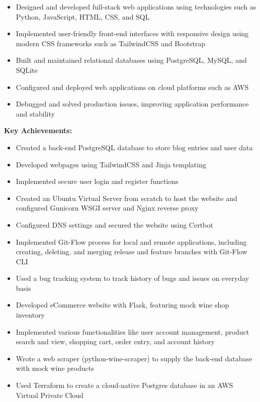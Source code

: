 \documentclass[
    10pt,
    A4,
    english,
    draft = false,
    twoside = false,
]{article}
\begin{document}
    {
    \begin{itemize}
      \item Designed and developed full-stack web applications using technologies such as Python,           JavaScript, HTML, CSS, and SQL
      \item Implemented user-friendly front-end interfaces with responsive design using modern CSS          frameworks such as TailwindCSS and Bootstrap
      \item Built and maintained relational databases using PostgreSQL, MySQL, and SQLite
      \item Configured and deployed web applications on cloud platforms such as AWS
      \item Debugged and solved production issues, improving application performance and stability
   \end{itemize}
   \begin{description}
   \textcolor{light-blue}
    {\-\hspace{-.45cm} \textbf{Key Achievements:}}
   \end{description}
   \begin{itemize}
      \item Created a back-end PostgreSQL database to store blog entries and user data
      \item Developed webpages using TailwindCSS and Jinja templating
      \item Implemented secure user login and register functions
      \item Created an Ubuntu Virtual Server from scratch to host the website and configured Gunicorn WSGI server and Nginx reverse proxy
      \item Configured DNS settings and secured the website using Certbot
      \item Implemented Git-Flow process for local and remote applications, including creating, deleting, and merging release and feature branches with Git-Flow CLI
      \item Used a bug tracking system to track history of bugs and issues on everyday basis
      \item Developed eCommerce website with Flask, featuring mock wine shop inventory
      \item Implemented various functionalities like user account management, product search and view, shopping cart, order entry, and account history
      \item Wrote a web scraper (python-wine-scraper) to supply the back-end database with mock wine products
      \item Used Terraform to create a cloud-native Postgres database in an AWS Virtual Private Cloud
    \end{itemize}
    }
    
\end{document}
